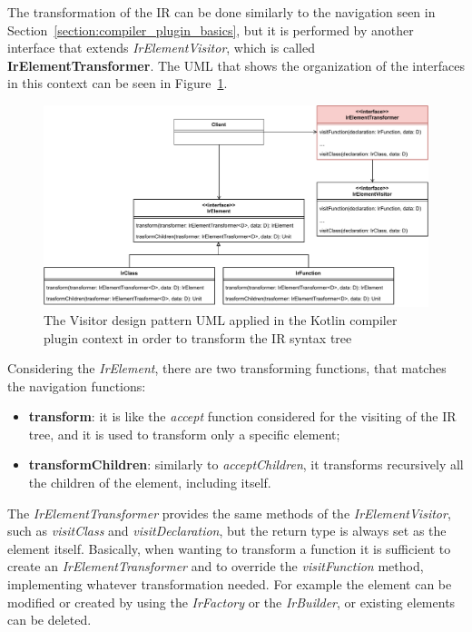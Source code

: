 The transformation of the IR can be done similarly to the navigation seen in Section~\ref{section:compiler_plugin_basics}, but it is performed by another interface that extends \textit{IrElementVisitor}, which is called \textbf{IrElementTransformer}. The UML that shows the organization of the interfaces in this context can be seen in Figure~\ref{fig:transformer_uml_kotlin_compiler}.\newline
\begin{figure}[!ht]
    \centering
    \includegraphics[scale=0.69]{document/chapters/2-metaprogramming/images/transformer_uml_kotlin_compiler.pdf}
    \caption{The Visitor design pattern UML applied in the Kotlin compiler plugin context in order to transform the IR syntax tree}
    \label{fig:transformer_uml_kotlin_compiler}
\end{figure}
Considering the \textit{IrElement}, there are two transforming functions, that matches the navigation functions:
\begin{itemize}
    \item \textbf{transform}: it is like the \textit{accept} function considered for the visiting of the IR tree, and it is used to transform only a specific element;
    \item \textbf{transformChildren}: similarly to \textit{acceptChildren}, it transforms recursively all the children of the element, including itself.
\end{itemize}
The \textit{IrElementTransformer} provides the same methods of the \textit{IrElementVisitor}, such as \textit{visitClass} and \textit{visitDeclaration}, but the return type is always set as the element itself. Basically, when wanting to transform a function it is sufficient to create an \textit{IrElementTransformer} and to override the \textit{visitFunction} method, implementing whatever transformation needed. For example the element can be modified  or created by using the \textit{IrFactory} or the \textit{IrBuilder}, or existing elements can be deleted.

